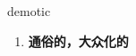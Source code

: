 
\begin{frame}
{\huge demotic}
\begin{center}
\begin{enumerate}\Large
  \item \textbf{通俗的，大众化的}
\end{enumerate}
\end{center}
\end{frame}
